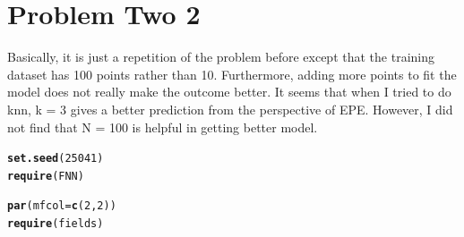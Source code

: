 \documentclass{article}\usepackage[]{graphicx}\usepackage[]{color}
\makeatletter
\newcommand{\hlnum}[1]{\textcolor[rgb]{0.686,0.059,0.569}{#1}}%
\newcommand{\hlstd}[1]{\textcolor[rgb]{0.345,0.345,0.345}{#1}}%
\newcommand{\hlkwc}[1]{\textcolor[rgb]{0.333,0.667,0.333}{#1}}%
\newcommand{\hlkwd}[1]{\textcolor[rgb]{0.737,0.353,0.396}{\textbf{#1}}}%
\newenvironment{kframe}{%
 \def\at@end@of@kframe{}%
 \ifinner\ifhmode%
  \def\at@end@of@kframe{\end{minipage}}%
  \begin{minipage}{\columnwidth}%
 \fi\fi%
 \def\FrameCommand##1{\hskip\@totalleftmargin \hskip-\fboxsep
 \colorbox{shadecolor}{##1}\hskip-\fboxsep
     \hskip-\linewidth \hskip-\@totalleftmargin \hskip\columnwidth}%
 \MakeFramed {\advance\hsize-\width
   \@totalleftmargin\z@ \linewidth\hsize
   \@setminipage}}%
 {\par\unskip\endMakeFramed%
 \at@end@of@kframe}
\newenvironment{knitrout}{}{} %
\makeatother
\begin{document}
\section*{Problem Two 2}
Basically, it is just a repetition of the problem before except that the training dataset has 100 points rather than 10. Furthermore, adding more points to fit the model does not really make the outcome better. It seems that when I tried to do knn, k = 3 gives a better prediction from the perspective of EPE. However, I did not find that N = 100 is helpful in getting better model.

\begin{knitrout}
\color{fgcolor}\begin{kframe}
\begin{alltt}
\hlkwd{set.seed}\hlstd{(}\hlnum{25041}\hlstd{)}
\hlkwd{require}\hlstd{(FNN)}
\end{alltt}


{\ttfamily\noindent\itshape\color{messagecolor}{\#\# Loading required package: FNN}}

{\ttfamily\noindent\color{warningcolor}{\#\# Warning: package 'FNN' was built under R version 3.0.2}}\begin{alltt}
\hlkwd{par}\hlstd{(}\hlkwc{mfcol} \hlstd{=} \hlkwd{c}\hlstd{(}\hlnum{2}\hlstd{,} \hlnum{2}\hlstd{))}
\hlkwd{require}\hlstd{(fields)}
\end{alltt}



\end{kframe}
\end{knitrout}
\end{document}
